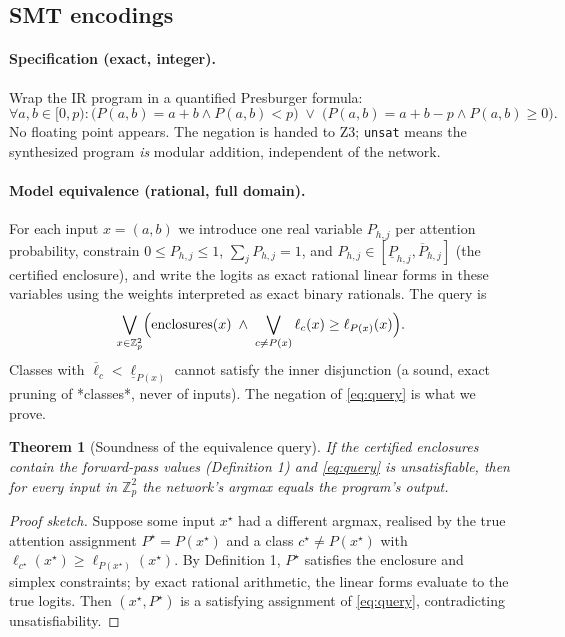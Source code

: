 \documentclass[11pt]{article}
\newtheorem{theorem}{Theorem}
\newcommand{\Zp}{\mathbb{Z}_p}
\newcommand{\code}[1]{\texttt{#1}}
\begin{document}
\subsection{SMT encodings}

\paragraph{Specification (exact, integer).}
Wrap the IR program in a quantified Presburger formula:
\begin{equation}
  \forall a,b \in [0,p): \bigl(P(a,b) = a+b \wedge P(a,b) < p\bigr)
  \;\vee\; \bigl(P(a,b) = a+b-p \wedge P(a,b) \ge 0\bigr).
\end{equation}
No floating point appears. The negation is handed to Z3; \code{unsat} means the
synthesized program \emph{is} modular addition, independent of the network.

\paragraph{Model equivalence (rational, full domain).}
For each input $x=(a,b)$ we introduce one real variable $P_{h,j}$ per attention
probability, constrain $0 \le P_{h,j} \le 1$, $\sum_j P_{h,j} = 1$, and
$P_{h,j} \in [\underline{P}_{h,j}, \overline{P}_{h,j}]$ (the certified
enclosure), and write the logits as exact rational linear forms in these
variables using the weights interpreted as exact binary rationals. The query is
\begin{equation}
  \bigvee_{x \in \Zp^2} \Bigl(\text{enclosures}(x) \;\wedge\;
  \bigvee_{c \ne P(x)} \ell_c(x) \ge \ell_{P(x)}(x)\Bigr).
  \label{eq:query}
\end{equation}
Classes with $\overline{\ell}_c < \underline{\ell}_{P(x)}$ cannot satisfy the
inner disjunction (a sound, exact pruning of *classes*, never of inputs). The
negation of \eqref{eq:query} is what we prove.

\begin{theorem}[Soundness of the equivalence query]
\label{thm:sound}
If the certified enclosures contain the forward-pass values (Definition 1) and
\eqref{eq:query} is unsatisfiable, then for every input in $\Zp^2$ the network's
argmax equals the program's output.
\end{theorem}
\begin{proof}[Proof sketch]
Suppose some input $x^\star$ had a different argmax, realised by the true
attention assignment $P^\star = P(x^\star)$ and a class $c^\star \ne P(x^\star)$
with $\ell_{c^\star}(x^\star) \ge \ell_{P(x^\star)}(x^\star)$. By Definition 1,
$P^\star$ satisfies the enclosure and simplex constraints; by exact rational
arithmetic, the linear forms evaluate to the true logits. Then
$(x^\star, P^\star)$ is a satisfying assignment of \eqref{eq:query}, contradicting
unsatisfiability.
\end{proof}
\end{document}
